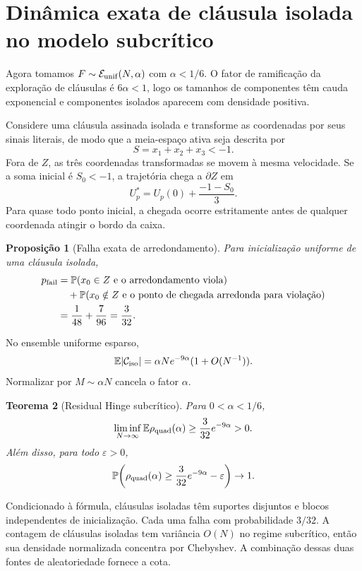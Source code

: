 \documentclass[11pt,a4paper]{article}
\newtheorem{theorem}{Teorema}[section]
\newtheorem{proposition}[theorem]{Proposição}
\begin{document}
\section{Dinâmica exata de cláusula isolada no modelo subcrítico}
Agora tomamos $F\sim\mathcal E_{\rm unif}(N,\alpha)$ com $\alpha<1/6$. O fator de ramificação da exploração de cláusulas é $6\alpha<1$, logo os tamanhos de componentes têm cauda exponencial e componentes isolados aparecem com densidade positiva.

Considere uma cláusula assinada isolada e transforme as coordenadas por seus sinais literais, de modo que a meia-espaço ativa seja descrita por
\[
S=x_1+x_2+x_3<-1.
\]
Fora de $Z$, as três coordenadas transformadas se movem à mesma velocidade. Se a soma inicial é $S_0<-1$, a trajetória chega a $\partial Z$ em
\begin{equation}
U_p^*=U_p(0)+\frac{-1-S_0}{3}.
\end{equation}
Para quase todo ponto inicial, a chegada ocorre estritamente antes de qualquer coordenada atingir o bordo da caixa.

\begin{proposition}[Falha exata de arredondamento]
Para inicialização uniforme de uma cláusula isolada,
\begin{align}
p_{\rm fail}&=\mathbb P(x_0\in Z\ \text{e o arredondamento viola})\\
&\quad+\mathbb P(x_0\notin Z\ \text{e o ponto de chegada arredonda para violação})\\
&=\frac1{48}+\frac7{96}=\frac3{32}.
\end{align}
\end{proposition}

No ensemble uniforme esparso,
\[
\mathbb E|\mathcal C_{\rm iso}|=\alpha Ne^{-9\alpha}(1+O(N^{-1})).
\]
Normalizar por $M\sim\alpha N$ cancela o fator $\alpha$.

\begin{theorem}[Residual Hinge subcrítico]
Para $0<\alpha<1/6$,
\[
\liminf_{N\to\infty}\mathbb E\rho_{\rm quad}(\alpha)\ge\frac3{32}e^{-9\alpha}>0.
\]
Além disso, para todo $\varepsilon>0$,
\[
\mathbb P\!\left(\rho_{\rm quad}(\alpha)\ge\frac3{32}e^{-9\alpha}-\varepsilon\right)\to1.
\]
\end{theorem}

Condicionado à fórmula, cláusulas isoladas têm suportes disjuntos e blocos independentes de inicialização. Cada uma falha com probabilidade $3/32$. A contagem de cláusulas isoladas tem variância $O(N)$ no regime subcrítico, então sua densidade normalizada concentra por Chebyshev. A combinação dessas duas fontes de aleatoriedade fornece a cota.
\end{document}
